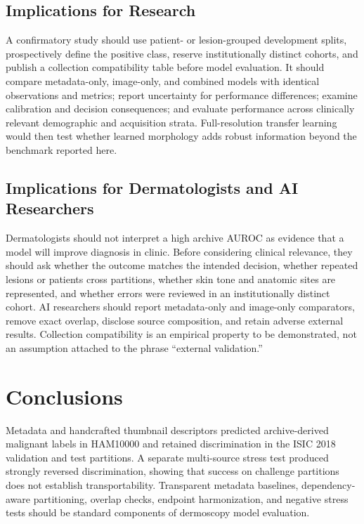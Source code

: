 \documentclass[11pt]{article}
\begin{document}
\subsection{Implications for Research}
A confirmatory study should use patient- or lesion-grouped development splits, prospectively define the positive class, reserve institutionally distinct cohorts, and publish a collection compatibility table before model evaluation. It should compare metadata-only, image-only, and combined models with identical observations and metrics; report uncertainty for performance differences; examine calibration and decision consequences; and evaluate performance across clinically relevant demographic and acquisition strata. Full-resolution transfer learning would then test whether learned morphology adds robust information beyond the benchmark reported here.

\subsection{Implications for Dermatologists and AI Researchers}
Dermatologists should not interpret a high archive AUROC as evidence that a model will improve diagnosis in clinic. Before considering clinical relevance, they should ask whether the outcome matches the intended decision, whether repeated lesions or patients cross partitions, whether skin tone and anatomic sites are represented, and whether errors were reviewed in an institutionally distinct cohort. AI researchers should report metadata-only and image-only comparators, remove exact overlap, disclose source composition, and retain adverse external results. Collection compatibility is an empirical property to be demonstrated, not an assumption attached to the phrase ``external validation.''

\section{Conclusions}
Metadata and handcrafted thumbnail descriptors predicted archive-derived malignant labels in HAM10000 and retained discrimination in the ISIC 2018 validation and test partitions. A separate multi-source stress test produced strongly reversed discrimination, showing that success on challenge partitions does not establish transportability. Transparent metadata baselines, dependency-aware partitioning, overlap checks, endpoint harmonization, and negative stress tests should be standard components of dermoscopy model evaluation.
\end{document}
